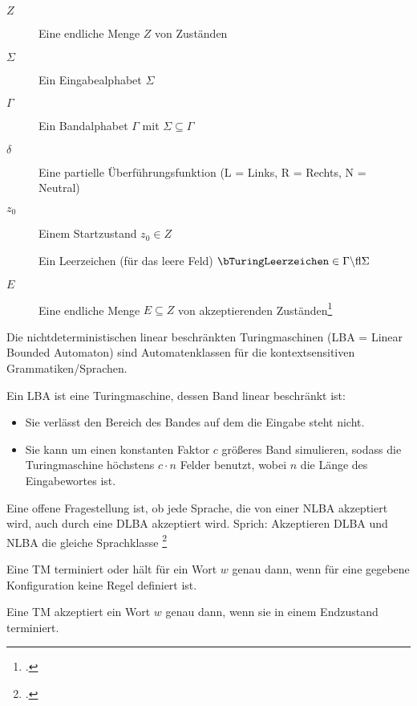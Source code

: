 \documentclass{bschlangaul-theorie}
\begin{document}
\begin{description}
\item[$Z$]
Eine endliche Menge $Z$ von Zuständen

\item[$\Sigma$]
Ein Eingabealphabet $\Sigma$

\item[$\Gamma$]
Ein Bandalphabet $\Gamma$ mit $\Sigma \subseteq\Gamma$

\item[$\delta$]
Eine partielle Überführungsfunktion
\bTuringUeberfuehrung (L = Links, R = Rechts, N = Neutral)

\item[$z_0$]
Einem Startzustand $z_0 \in Z$

\item[\bTuringLeerzeichen]
Ein Leerzeichen (für das leere Feld) $\bTuringLeerzeichen \in \Gamma \string\ \Sigma$

\item[$E$]
Eine endliche Menge $E \subseteq Z$ von
akzeptierenden Zuständen\footcite[Seite 21]{theo:fs:3}
\end{description}

Die nichtdeterministischen linear beschränkten Turingmaschinen
(LBA = Linear Bounded Automaton) sind Automatenklassen für die
kontextsensitiven Grammatiken/Sprachen.

Ein LBA ist eine Turingmaschine, dessen Band linear beschränkt ist:

\begin{itemize}
\item[Definition 1]

Sie verlässt den Bereich des Bandes auf dem die Eingabe steht nicht.

\item[Definition 2]

Sie kann um einen konstanten Faktor $c$ größeres Band simulieren, sodass
die Turingmaschine höchstens $c \cdot n$ Felder benutzt, wobei $n$ die
Länge des Eingabewortes ist.
\end{itemize}

Eine offene Fragestellung ist, ob jede Sprache, die von einer NLBA
akzeptiert wird, auch durch eine DLBA akzeptiert wird. Sprich:
Akzeptieren DLBA und NLBA die gleiche Sprachklasse
\footcite[Seite 10]{theo:fs:3}

Eine TM terminiert oder hält für ein Wort $w$ genau dann, wenn für
eine gegebene Konfiguration keine Regel definiert ist.

Eine TM akzeptiert ein Wort $w$ genau dann, wenn sie in einem
Endzustand terminiert.
\end{document}
